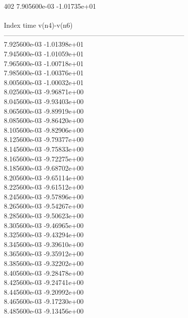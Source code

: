 402	7.905600e-03	-1.01735e+01	\\ \hline
\\ \hline
Index   time            v(n4)-v(n6)     \\ \hline
--------------------------------------------------------------------------------\\ 	7.925600e-03	-1.01398e+01	\\ 	7.945600e-03	-1.01059e+01	\\ 	7.965600e-03	-1.00718e+01	\\ 	7.985600e-03	-1.00376e+01	\\ 	8.005600e-03	-1.00032e+01	\\ 	8.025600e-03	-9.96871e+00	\\ 	8.045600e-03	-9.93403e+00	\\ 	8.065600e-03	-9.89919e+00	\\ 	8.085600e-03	-9.86420e+00	\\ 	8.105600e-03	-9.82906e+00	\\ 	8.125600e-03	-9.79377e+00	\\ 	8.145600e-03	-9.75833e+00	\\ 	8.165600e-03	-9.72275e+00	\\ 	8.185600e-03	-9.68702e+00	\\ 	8.205600e-03	-9.65114e+00	\\ 	8.225600e-03	-9.61512e+00	\\ 	8.245600e-03	-9.57896e+00	\\ 	8.265600e-03	-9.54267e+00	\\ 	8.285600e-03	-9.50623e+00	\\ 	8.305600e-03	-9.46965e+00	\\ 	8.325600e-03	-9.43294e+00	\\ 	8.345600e-03	-9.39610e+00	\\ 	8.365600e-03	-9.35912e+00	\\ 	8.385600e-03	-9.32202e+00	\\ 	8.405600e-03	-9.28478e+00	\\ 	8.425600e-03	-9.24741e+00	\\ 	8.445600e-03	-9.20992e+00	\\ 	8.465600e-03	-9.17230e+00	\\ 	8.485600e-03	-9.13456e+00	\\ \hline
